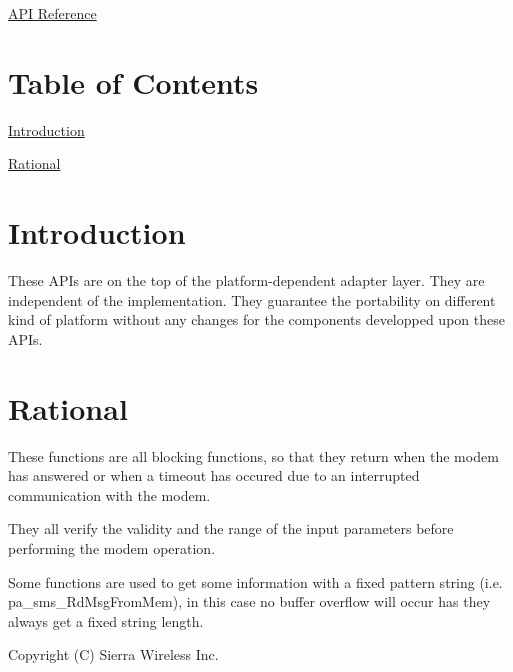 \hyperlink{pa__sms_8h}{A\+PI Reference}



\hypertarget{c_pa_sms_pa_sms_toc}{}\section{Table of Contents}\label{c_pa_sms_pa_sms_toc}

\begin{DoxyItemize}
\item \hyperlink{c_pa_sms_pa_sms_intro}{Introduction}
\item \hyperlink{c_pa_sms_pa_sms_rational}{Rational}
\end{DoxyItemize}\hypertarget{c_pa_sms_pa_sms_intro}{}\section{Introduction}\label{c_pa_sms_pa_sms_intro}
These A\+P\+Is are on the top of the platform-\/dependent adapter layer. They are independent of the implementation. They guarantee the portability on different kind of platform without any changes for the components developped upon these A\+P\+Is.\hypertarget{c_pa_sms_pa_sms_rational}{}\section{Rational}\label{c_pa_sms_pa_sms_rational}
These functions are all blocking functions, so that they return when the modem has answered or when a timeout has occured due to an interrupted communication with the modem.

They all verify the validity and the range of the input parameters before performing the modem operation.

Some functions are used to get some information with a fixed pattern string (i.\+e. pa\+\_\+sms\+\_\+\+Rd\+Msg\+From\+Mem), in this case no buffer overflow will occur has they always get a fixed string length.





Copyright (C) Sierra Wireless Inc. 